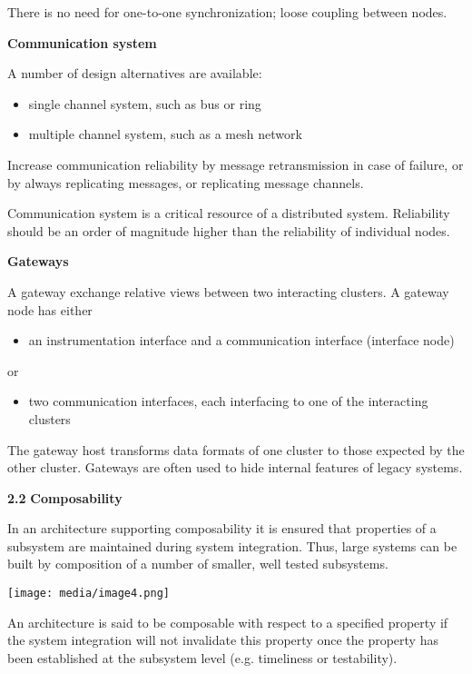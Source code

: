 There is no need for one-to-one synchronization; loose coupling between
nodes.

\textbf{Communication system}

A number of design alternatives are available:

\begin{itemize}
\item
  single channel system, such as bus or ring
\item
  multiple channel system, such as a mesh network
\end{itemize}

Increase communication reliability by message retransmission in case of
failure, or by always replicating messages, or replicating message
channels.

Communication system is a critical resource of a distributed system.
Reliability should be an order of magnitude higher than the reliability
of individual nodes.

\textbf{Gateways}

A gateway exchange relative views between two interacting clusters. A
gateway node has either

\begin{itemize}
\item
  an instrumentation interface and a communication interface (interface
  node)
\end{itemize}

or

\begin{itemize}
\item
  two communication interfaces, each interfacing to one of the
  interacting clusters
\end{itemize}

The gateway host transforms data formats of one cluster to those
expected by the other cluster. Gateways are often used to hide internal
features of legacy systems.

\textbf{2.2} \protect\hypertarget{teil3}{}{}\textbf{Composability }

In an architecture supporting composability it is ensured that
properties of a subsystem are maintained during system integration.
Thus, large systems can be built by composition of a number of smaller,
well tested subsystems.

\texttt{[image: media/image4.png]}

An architecture is said to be composable with respect to a specified
property if the system integration will not invalidate this property
once the property has been established at the subsystem level (e.g.
timeliness or testability).

